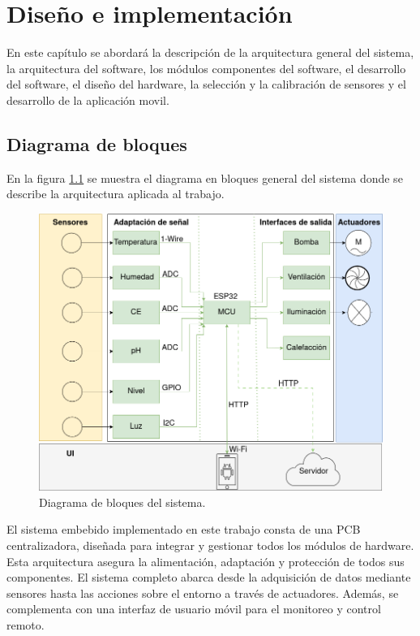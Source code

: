 \chapter{Diseño e implementación} %

\label{Chapter3} %

En este capítulo se abordará la descripción de la arquitectura general del sistema, la arquitectura del software, los módulos componentes del software, el desarrollo del software, el diseño del hardware, la selección y la calibración de sensores y el desarrollo de la aplicación movil.
\section{Diagrama de bloques}
En la figura \ref{fig:d_bloques} se muestra el diagrama en bloques general del sistema donde se describe la arquitectura aplicada al trabajo.

\begin{figure}[h]
\centering
\includegraphics[scale=.4]{./Figures/d_bloques.png}
	\caption{Diagrama de bloques del sistema.}
	\label{fig:d_bloques}
\end{figure}

El sistema embebido implementado en este trabajo consta de una PCB centralizadora, diseñada para integrar y gestionar todos los módulos de hardware. Esta arquitectura asegura la alimentación, adaptación y protección de todos sus componentes. El sistema completo abarca desde la adquisición de datos mediante sensores hasta las acciones sobre el entorno a través de actuadores. Además, se complementa con una interfaz de usuario móvil para el monitoreo y control remoto.

